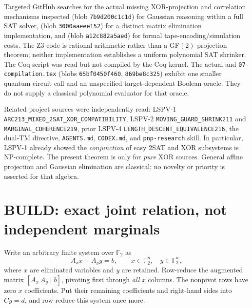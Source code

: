 \documentclass[11pt]{article}
\begin{document}
Targeted GitHub searches for the actual missing XOR-projection and correlation mechanisms inspected  (blob \texttt{7b9d200c1c1d}) for Gaussian reasoning within a full SAT solver,  (blob \texttt{3000aaeee152}) for a distinct matrix elimination implementation, and  (blob \texttt{a12c882a5aed}) for formal tape-encoding/simulation costs. The Z3 code is rational arithmetic rather than a GF$(2)$ projection theorem; neither implementation establishes a uniform polynomial SAT shrinker. The Coq script was read but not compiled by the Coq kernel. The actual  and \texttt{07-compilation.tex} (blobs \texttt{65bf0450f460}, \texttt{869be8c325}) exhibit one smaller quantum circuit call and an unspecified target-dependent Boolean oracle. They do not supply a classical polynomial evaluator for that oracle.

Related project sources were independently read: LSPV-1 \texttt{ARC213\_MIXED\_2SAT\_XOR\_COMPATIBILITY}, LSPV-2 \texttt{MOVING\_GUARD\_SHRINK211} and \texttt{MARGINAL\_COHERENCE219}, prior LSPV-4 \texttt{LENGTH\_DESCENT\_EQUIVALENCE216}, the dual-TM directive, \texttt{AGENTS.md}, \texttt{CODEX.md}, and \texttt{pnp-research} skill. In particular, LSPV-1 already showed the \emph{conjunction} of easy 2SAT and XOR subsystems is NP-complete. The present theorem is only for \emph{pure} XOR sources. General affine projection and Gaussian elimination are classical; no novelty or priority is asserted for that algebra.

\section{BUILD: exact joint relation, not independent marginals}
Write an arbitrary finite system over $\mathbb F_2$ as
\[
A_x x+A_y y=b,
\qquad x\in\mathbb F_2^p,\quad y\in\mathbb F_2^w,
\]
where $x$ are eliminated variables and $y$ are retained. Row-reduce the augmented matrix $[A_x\ A_y\mid b]$, pivoting first through \emph{all} $x$ columns. The nonpivot rows have zero $x$ coefficients. Put their remaining coefficients and right-hand sides into $Cy=d$, and row-reduce this system once more.
\end{document}
